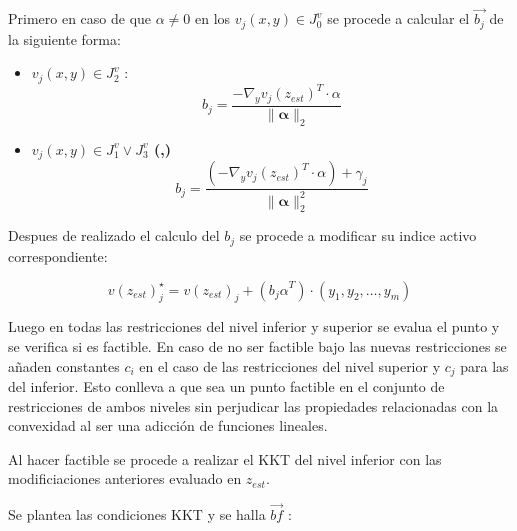 Primero en caso de que $\alpha \neq 0$ en los $v_j(x,y) \in J_0^v$ se procede a calcular el $\vec{b_j}$ de la siguiente forma:

\begin{itemize}
    \item \textbf{ $v_j(x,y) \in J_2^v$ }:
        \begin{equation}
            b_j=  \frac{-\nabla_{y}{v_j(z_{est})}^T \cdot \alpha}{\|\mathbf{\alpha} \|_2}
        \end{equation}
    \item \textbf{$v_j(x,y) \in J_1^v \lor J_3^v$ (,)}\\
    \begin{equation}
        b_j=  \frac{(-\nabla_{y}{v_j(z_{est})}^T \cdot \alpha)+\gamma_j}{\|\mathbf{\alpha} \|_2^2}
    \end{equation}
\end{itemize}


Despues de realizado el calculo del $b_j$ se procede a modificar su indice activo correspondiente:

\begin{equation}
	v(z_{est})_{j}^{\star}=v(z_{est})_{j}+ ({b_j\alpha}^T)\cdot (y_1,y_2,\dots,y_m)
\end{equation}


Luego en todas las restricciones del nivel inferior y superior
se evalua el punto y se verifica si es factible. En caso de no ser factible 
bajo las nuevas restricciones se añaden constantes $c_i$ en el caso de las restricciones del
nivel superior y $c_j$ para las del inferior. Esto conlleva a que sea un punto factible en el conjunto
de restricciones de ambos niveles sin perjudicar las propiedades relacionadas con la convexidad al ser una adicción
de funciones lineales. 

Al hacer factible se procede a realizar el KKT del nivel inferior con las modificiaciones anteriores evaluado en $z_{est}$.

Se plantea las condiciones KKT y se halla $\vec{bf}$ :


